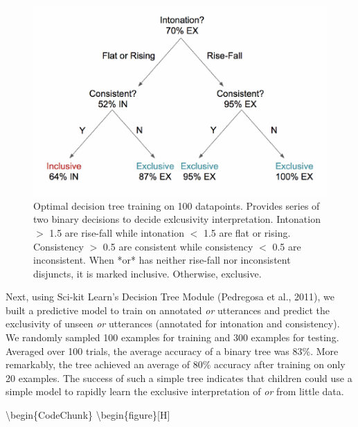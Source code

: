 \documentclass[10pt, letterpaper]{article}
\newenvironment{CodeChunk}{}{}
\begin{document}
\begin{CodeChunk}
\begin{figure}[H]

{\centering \includegraphics{figs/treeDiagram-1} 

}

\caption[Optimal decision tree training on 100 datapoints]{Optimal decision tree training on 100 datapoints. Provides series of two binary decisions to decide exlcusivity interpretation. Intonation $>$ 1.5 are rise-fall while intonation $<$ 1.5 are flat or rising. Consistency $>$ 0.5 are consistent while consistency $<$ 0.5 are  inconsistent. When *or* has neither rise-fall nor inconsistent disjuncts, it is marked inclusive. Otherwise, exclusive.}\label{fig:treeDiagram}
\end{figure}
\end{CodeChunk}

Next, using Sci-kit Learn's Decision Tree Module (Pedregosa et al.,
2011), we built a predictive model to train on annotated \emph{or}
utterances and predict the exclusivity of unseen \emph{or} utterances
(annotated for intonation and consistency). We randomly sampled 100
examples for training and 300 examples for testing. Averaged over 100
trials, the average accuracy of a binary tree was 83\%. More remarkably,
the tree achieved an average of 80\% accuracy after training on only 20
examples. The success of such a simple tree indicates that children
could use a simple model to rapidly learn the exclusive interpretation
of \emph{or} from little data.

\textbackslash{}begin\{CodeChunk\}
\textbackslash{}begin\{figure\}{[}H{]}
\end{document}
